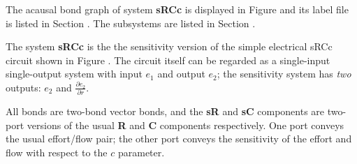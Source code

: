 

   The acausal bond graph of system \textbf{sRCc} is
   displayed in Figure  and its label
   file is listed in Section .
   The subsystems are listed in Section .

The system \textbf{sRCc} is the the sensitivity version of the simple
electrical sRCc circuit shown in Figure . The circuit itself can be
regarded as a single-input single-output system with input $e_1$ and
output $e_2$; the sensitivity system has {\em two\/} outputs: $e_2$
and $\frac{\partial e_2}{\partial r}$.

All bonds are two-bond vector bonds, and the {\bf sR} and {\bf sC}
components are two-port versions of the usual {\bf R} and {\bf C}
components respectively. One port conveys the usual effort/flow pair;
the other port conveys the sensitivity of the effort and flow with
respect to the $c$ parameter.

